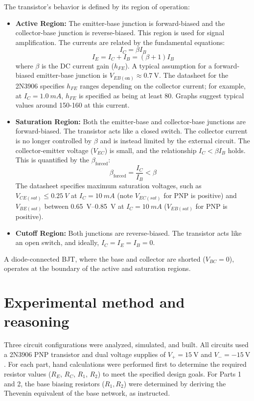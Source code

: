 \documentclass[12pt]{article}
\begin{document}
The transistor's behavior is defined by its region of operation:
\begin{itemize}
  \item \textbf{Active Region:} The emitter-base junction is forward-biased and the collector-base junction is reverse-biased. This region is used for signal amplification. The currents are related by the fundamental equations:
    $$I_C = \beta I_B$$
    $$I_E = I_C + I_B = (\beta + 1)I_B$$
    where $\beta$ is the DC current gain ($h_{FE}$). A typical assumption for a forward-biased emitter-base junction is $V_{EB(\text{on})} \approx \SI{0.7}{\volt}$. The datasheet for the 2N3906 specifies $h_{FE}$ ranges depending on the collector current; for example, at $I_C = \SI{1.0}{mA}$, $h_{FE}$ is specified as being at least 80. Graphs suggest typical values around 150-160 at this current.

  \item \textbf{Saturation Region:} Both the emitter-base and collector-base junctions are forward-biased. The transistor acts like a closed switch. The collector current is no longer controlled by $\beta$ and is instead limited by the external circuit. The collector-emitter voltage ($V_{EC}$) is small, and the relationship $I_C < \beta I_B$ holds. This is quantified by the $\beta_{\text{forced}}$:
    $$\beta_{\text{forced}} = \frac{I_C}{I_B} < \beta$$
    The datasheet specifies maximum saturation voltages, such as $V_{CE(sat)} \leq \SI{0.25}{V}$ at $I_C = \SI{10}{mA}$ (note $V_{EC(sat)}$ for PNP is positive) and $V_{BE(sat)}$ between \SIrange{0.65}{0.85}{V} at $I_C = \SI{10}{mA}$ ($V_{EB(sat)}$ for PNP is positive).

  \item \textbf{Cutoff Region:} Both junctions are reverse-biased. The transistor acts like an open switch, and ideally, $I_C = I_E = I_B = 0$.
\end{itemize}
A diode-connected BJT, where the base and collector are shorted ($V_{BC} = 0$), operates at the boundary of the active and saturation regions.

\section{Experimental method and reasoning}
Three circuit configurations were analyzed, simulated, and built. All circuits used a 2N3906 PNP transistor and dual voltage supplies of $V_{+} = \SI{15}{\volt}$ and $V_{-} = \SI{-15}{\volt}$. For each part, hand calculations were performed first to determine the required resistor values ($R_E$, $R_C$, $R_1$, $R_2$) to meet the specified design goals. For Parts 1 and 2, the base biasing resistors ($R_1, R_2$) were determined by deriving the Thevenin equivalent of the base network, as instructed.
\end{document}
